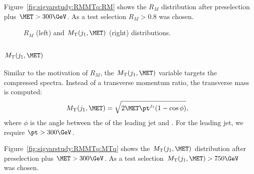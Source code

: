 Figure~\ref{fig:sigvarstudy:RMMTq:RM} shows the $R_M$ distribution after preselection plus $\MET>300\GeV$. As a test selection $R_M>0.8$ was chosen.

\begin{figure}
\caption{\label{fig:sigvarstudy:RMMTq} $R_M$ (left) and $\MT(j_1,\MET)$ (right) distributions.}
\end{figure}

\subsubsection{$\MT(j_1,\MET)$}

Similar to the motivation of $R_M$, the $\MT(j_1,\MET)$  variable targets the compressed spectra. Instead of a transverse momentum ratio, the transverse mass is computed:
\begin{equation}
\MT(j_1,\MET) = \sqrt{2\MET\pt^{j_1}(1-\cos\phi)},
\end{equation}
where $\phi$ is the angle between the \ptvec of the leading jet and \VEtmiss.
For the leading jet, we require $\pt>300\GeV$.

Figure~\ref{fig:sigvarstudy:RMMTq:MTq} shows the $\MT(j_1,\MET)$ distribution after preselection plus $\MET>300\GeV$. As a test selection $\MT(j_1,\MET)>750\GeV$ was chosen.

